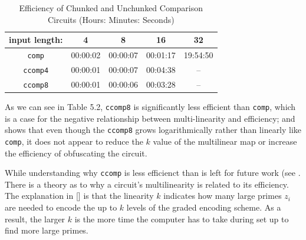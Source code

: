 \documentclass[12pt,twoside]{reedthesis}
\begin{document}
 \begin{table}[htbp] %
\caption[]{Efficiency of Chunked and Unchunked Comparison Circuits (Hours: Minutes: Seconds)} 
\begin{center} 
\begin{tabular}{c c c c c} 
\toprule %
  input length: &4 & 8 & 16 &32 \\ %
  \midrule %
	\texttt{comp} &00:00:02 &00:00:07 & 00:01:17 &19:54:50\\
	\texttt{ccomp4} &00:00:01 &00:00:07 &00:04:38 & -- \\
	\texttt{ccomp8} &00:00:01 &00:00:06 & 00:03:28 & -- \\
		\bottomrule %
\end{tabular}
\end{center}
\label{inheritance} %
\end{table}

\par As we can see in Table 5.2, \texttt{ccomp8} is significantly less efficient than \texttt{comp}, which is a case for the negative relationship between multi-linearity and efficiency; and shows that even though the \texttt{ccomp8} grows logarithmically rather than linearly like \texttt{comp}, it does not appear to reduce the $k$ value of the multilinear map or increase the efficiency of obfuscating the circuit. 
\par While understanding why \texttt{ccomp} is less efficienct than  is left for future work (see . There is a theory as to why a circuit's multilinearity is related to its efficiency. The explanation in [\cite{5genc}] is that the linearity $k$ indicates how many large primes $z_i$ are needed to encode the up to $k$ levels of the graded encoding scheme.  As a result, the larger $k$ is the more time the computer has to take during set up to find more large primes. 


 
\end{document}
